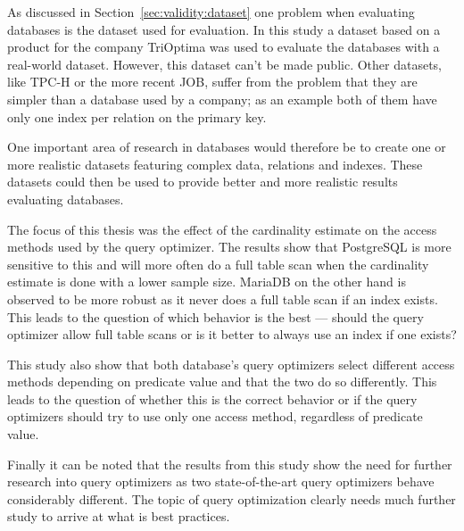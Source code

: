 As discussed in Section~\ref{sec:validity:dataset} one problem when evaluating
databases is the dataset used for evaluation. In this study a dataset based on a
product for the company TriOptima was used to evaluate the databases with a real-world
dataset. However, this dataset can't be made public. Other datasets, like TPC-H
or the more recent JOB, suffer from the problem that they are simpler
than a database used by a company; as an example both of them have only one
index per relation on the primary key.

One important area of research in databases would therefore be to create one or
more realistic datasets featuring complex data, relations and indexes.
These datasets could then be used to provide better and more realistic results
evaluating databases.

The focus of this thesis was the effect of the cardinality estimate on the
access methods used by the query optimizer. The results show that PostgreSQL is
more sensitive to this and will more often do a full table scan when the
cardinality estimate is done with a lower sample size. MariaDB on the other hand
is observed to be more robust as it never does a full table scan if an index
exists. This leads to the question of which behavior is the best --- should the
query optimizer allow full table scans or is it better to always use an index if
one exists?

This study also show that both database's query optimizers select
different access methods depending on predicate value and that the two do so
differently. This leads to the question of whether this is the correct behavior
or if the query optimizers should try to use only one access method, regardless
of predicate value.

Finally it can be noted that the results from this study show the need for
further research into query optimizers as two state-of-the-art query optimizers
behave considerably different. The topic of query optimization clearly needs
much further study to arrive at what is best practices.
